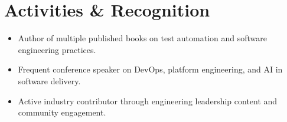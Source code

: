 \documentclass[letterpaper,11pt]{article}
\makeatletter
\newcommand{\resumeItem}[1]{
  \item\small{
    {#1 \vspace{-2pt}}
  }
}
\newcommand{\resumeProjectHeading}[2]{
    \item
    \begin{tabular*}{0.97\textwidth}{l@{\extracolsep{\fill}}r}
      \small#1 & #2 \\
    \end{tabular*}\vspace{-7pt}
}
\newcommand{\resumeSubHeadingListStart}{\begin{itemize}[leftmargin=0.15in, label={}]}
\newcommand{\resumeSubHeadingListEnd}{\end{itemize}}
\newcommand{\resumeItemListStart}{\begin{itemize}}
\newcommand{\resumeItemListEnd}{\end{itemize}\vspace{-5pt}}
\makeatother
\begin{document}
\section{Activities \& Recognition}
\begin{itemize}[topsep=0pt, parsep=0pt, partopsep=0pt, itemsep=0pt]
  \item Author of multiple published books on test automation and software engineering practices.
  \item Frequent conference speaker on DevOps, platform engineering, and AI in software delivery.
  \item Active industry contributor through engineering leadership content and community engagement.
\end{itemize}




\end{document}
